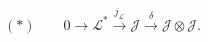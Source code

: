 \(\displaystyle
(\ast)\qquad
0 \longrightarrow \mathcal L^*
  \xrightarrow{j_{\mathcal L}}
\mathcal J
  \xrightarrow{\delta}
\mathcal J\otimes\mathcal J .
\)
